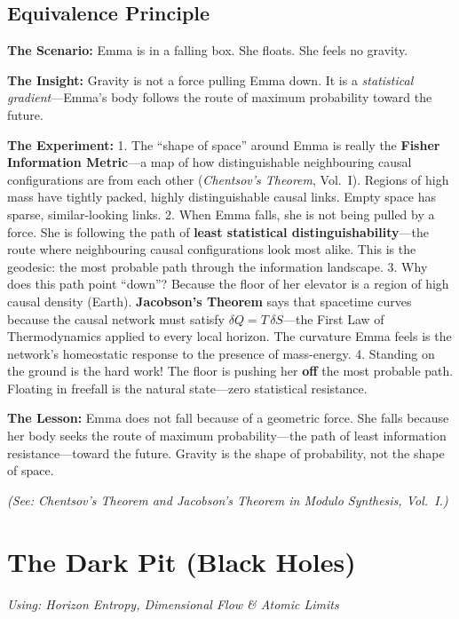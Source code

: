 \documentclass[11pt, a4paper, openany]{book}
\begin{document}
\section{Equivalence Principle}
\begin{thoughtexp}
\textbf{The Scenario:} Emma is in a falling box. She floats. She feels no gravity.

\textbf{The Insight:} Gravity is not a force pulling Emma down. It is a \emph{statistical gradient}---Emma's body follows the route of maximum probability toward the future.

\textbf{The Experiment:}
1. The ``shape of space'' around Emma is really the \textbf{Fisher Information Metric}---a map of how distinguishable neighbouring causal configurations are from each other (\textit{Chentsov's Theorem}, Vol.~I). Regions of high mass have tightly packed, highly distinguishable causal links. Empty space has sparse, similar-looking links.
2. When Emma falls, she is not being pulled by a force. She is following the path of \textbf{least statistical distinguishability}---the route where neighbouring causal configurations look most alike. This is the geodesic: the most probable path through the information landscape.
3. Why does this path point ``down''? Because the floor of her elevator is a region of high causal density (Earth). \textbf{Jacobson's Theorem} says that spacetime curves because the causal network must satisfy $\delta Q = T\,\delta S$---the First Law of Thermodynamics applied to every local horizon. The curvature Emma feels is the network's homeostatic response to the presence of mass-energy.
4. Standing on the ground is the hard work! The floor is pushing her \textbf{off} the most probable path. Floating in freefall is the natural state---zero statistical resistance.

\textbf{The Lesson:} Emma does not fall because of a geometric force. She falls because her body seeks the route of maximum probability---the path of least information resistance---toward the future. Gravity is the shape of probability, not the shape of space.

\textit{(See: Chentsov's Theorem and Jacobson's Theorem in Modulo Synthesis, Vol.~I.)}
\end{thoughtexp}


\chapter{The Dark Pit (Black Holes)}
\textit{Using: Horizon Entropy, Dimensional Flow \& Atomic Limits}
\end{document}
